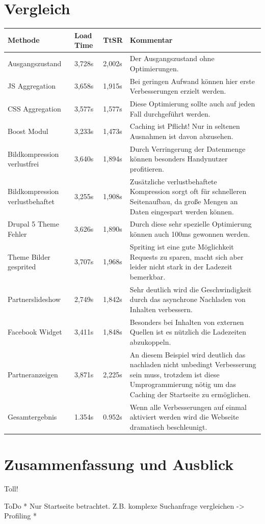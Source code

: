 \section{Vergleich}
\begin{center}
    \begin{longtable}{ | p{4cm} | p{1cm} | p{1cm} | p{6cm} |}
    \hline
    Methode & Load Time & TtSR & Kommentar \\ \hline
    \hline
    Ausgangszustand 	& 3,728s  & 2,002s & Der Ausgangszustand ohne Optimierungen. \\ \hline
    JS Aggregation 	& 3,658s  & 1,915s & Bei geringen Aufwand können hier erste Verbesserungen erzielt werden. \\ \hline
    CSS Aggregation 	& 3,577s  & 1,577s & Diese Optimierung sollte auch auf jeden Fall durchgeführt werden. \\ \hline
    Boost Modul 	& 3,233s  & 1,473s & Caching ist Pflicht! Nur in seltenen Ausnahmen ist davon abzusehen. \\ \hline
    Bildkompression verlustfrei 	& 3,640s  & 1,894s & Durch Verringerung der Datenmenge können besonders Handynutzer profitieren.  \\ \hline
    Bildkompression verlustbehaftet 	& 3,255s  & 1,908s & Zusätzliche verlustbehaftete Kompression sorgt oft für schnelleren Seitenaufbau, da große Mengen an Daten eingespart werden können.  \\ \hline
    Drupal 5 Theme Fehler 	& 3,626s  & 1,890s & Durch diese sehr spezielle Optimierung können auch 100ms gewonnen werden.  \\ \hline
    Theme Bilder gesprited 	& 3,707s  & 1,968s & Spriting ist eine gute Möglichkeit Requests zu sparen, macht sich aber leider nicht stark in der Ladezeit bemerkbar.  \\ \hline
    Partnerslideshow 	& 2,749s  & 1,842s & Sehr deutlich wird die Geschwindigkeit durch das asynchrone Nachladen von Inhalten verbessern.  \\ \hline
    Facebook Widget 	& 3,411s  & 1,848s & Besonders bei Inhalten von externen Quellen ist es nützlich die Ladezeiten abzukoppeln.  \\ \hline
    Partneranzeigen 	& 3,871s  & 2,225s & An diesem Beispiel wird deutlich das nachladen nicht unbedingt Verbesserung sein muss, trotzdem ist diese Umprogrammierung nötig um das Caching der Startseite zu ermöglichen.  \\ \hline
    \hline
    Gesamtergebnis 	& 1.354s  & 0.952s & Wenn alle Verbesserungen auf einmal aktiviert werden wird die Webseite dramatisch beschleunigt.  \\ \hline
    
    \hline
    \end{longtable}
\end{center}


\section{Zusammenfassung und Ausblick}

Toll!


ToDo
 * Nur Startseite betrachtet. Z.B. komplexe Suchanfrage vergleichen -> Profiling
 * 